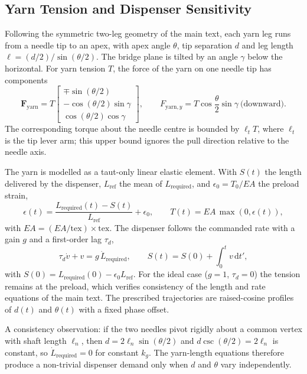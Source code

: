 \documentclass[12pt, a4paper]{article}
\begin{document}
\subsection{Yarn Tension and Dispenser Sensitivity}

Following the symmetric two-leg geometry of the main text, each yarn leg runs from a needle tip to an apex, with apex angle $\theta$, tip separation $d$ and leg length $\ell=(d/2)/\sin(\theta/2)$. The bridge plane is tilted by an angle $\gamma$ below the horizontal. For yarn tension $T$, the force of the yarn on one needle tip has components
\begin{equation}
\mathbf{F}_{\text{yarn}}
=
T
\begin{bmatrix}
\mp\sin(\theta/2)\\
-\cos(\theta/2)\sin\gamma\\
\cos(\theta/2)\cos\gamma
\end{bmatrix},
\qquad
F_{\text{yarn},y}=T\cos\frac{\theta}{2}\sin\gamma\ \text{(downward)}.
\end{equation}
The corresponding torque about the needle centre is bounded by $\ell_tT$, where $\ell_t$ is the tip lever arm; this upper bound ignores the pull direction relative to the needle axis.

The yarn is modelled as a taut-only linear elastic element. With $S(t)$ the length delivered by the dispenser, $L_{\text{ref}}$ the mean of $L_{\text{required}}$, and $\epsilon_0=T_0/EA$ the preload strain,
\begin{equation}
\epsilon(t)=\frac{L_{\text{required}}(t)-S(t)}{L_{\text{ref}}}+\epsilon_0,
\qquad
T(t)=EA\,\max\!\left(0,\epsilon(t)\right),
\end{equation}
with $EA=(EA/\text{tex})\times\text{tex}$. The dispenser follows the commanded rate with a gain $g$ and a first-order lag $\tau_d$,
\begin{equation}
\tau_d\dot v+v=g\,\dot L_{\text{required}},
\qquad
S(t)=S(0)+\int_0^t v\,\mathrm{d}t',
\end{equation}
with $S(0)=L_{\text{required}}(0)-\epsilon_0L_{\text{ref}}$. For the ideal case ($g=1$, $\tau_d=0$) the tension remains at the preload, which verifies consistency of the length and rate equations of the main text. The prescribed trajectories are raised-cosine profiles of $d(t)$ and $\theta(t)$ with a fixed phase offset.

A consistency observation: if the two needles pivot rigidly about a common vertex with shaft length $\ell_n$, then $d=2\ell_n\sin(\theta/2)$ and $d\csc(\theta/2)=2\ell_n$ is constant, so $\dot L_{\text{required}}=0$ for constant $k_g$. The yarn-length equations therefore produce a non-trivial dispenser demand only when $d$ and $\theta$ vary independently.
\end{document}
